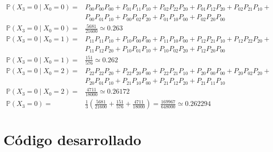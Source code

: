 \documentclass{article}
\begin{document}
            \begin{equation*}
                \begin{split}
                    \mathbb{P}(X_3 = 0 \mid X_0 = 0) =& P_{00} P_{00} P_{00} +  P_{01} P_{11} P_{10} +  P_{02} P_{22} P_{20} + P_{01} P_{12} P_{20} + P_{02} P_{21} P_{10} + \\ & P_{00} P_{01} P_{10} + P_{00} P_{02} P_{20} + P_{01} P_{10} P_{00} + P_{02} P_{20} P_{00} \\
                    \mathbb{P}(X_3 = 0 \mid X_0 = 0) =& \frac{5681}{21600} \simeq 0.263 \\
                    \mathbb{P}(X_3 = 0 \mid X_0 = 1) =& P_{11} P_{11} P_{10} + P_{10} P_{00} P_{00} + P_{11} P_{10} P_{00} + P_{12} P_{21} P_{10} + P_{12} P_{22} P_{20} + \\ & P_{11} P_{12} P_{20} + P_{10} P_{01} P_{10} + P_{10} P_{02} P_{20} + P_{12} P_{20} P_{00}\\
                    \mathbb{P}(X_3 = 0 \mid X_0 = 1) =& \frac{151}{576} \simeq 0.262 \\
                    \mathbb{P}(X_3 = 0 \mid X_0 = 2) =& P_{22} P_{22} P_{20} + P_{22} P_{20} P_{00} + P_{22} P_{21} P_{10} + P_{20} P_{00} P_{00} + P_{20} P_{02} P_{20} + \\ & P_{20} P_{01} P_{10} + P_{21} P_{10} P_{00} + P_{21} P_{12} P_{20} + P_{21} P_{11} P_{10} \\
                    \mathbb{P}(X_3 = 0 \mid X_0 = 2) =& \frac{4711}{18000} \simeq 0.26172 \\
                    \mathbb{P}(X_3 = 0) =& \frac{1}{3} \left(\frac{5681}{21600} + \frac{151}{576} + \frac{4711}{18000}\right) = \frac{169967}{648000} \simeq 0.262294
                \end{split}
            \end{equation*}
        \clearpage
        \appendix
        
        \section{Código desarrollado}
                
\end{document}
